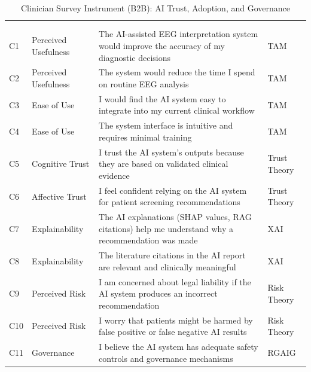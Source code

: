 {\tablestripes\tablefontsize
\begin{xltabular}{\textwidth}{@{} >{\raggedright\arraybackslash}p{0.5cm} >{\raggedright\arraybackslash}p{2.5cm} L p{1.5cm} @{}}
\caption{Clinician Survey Instrument (B2B): AI Trust, Adoption, and Governance}\label{app_tab:clinician_survey} \\
\toprule
\thead{\#} &  &  &  \\
\midrule
\endfirsthead
{} \\
\toprule
\thead{\#} &  &  &  \\
\midrule
\endhead
\bottomrule
\endlastfoot
C1 & Perceived Usefulness & The AI-assisted EEG interpretation system would improve the accuracy of my diagnostic decisions & TAM \\
\addlinespace
C2 & Perceived Usefulness & The system would reduce the time I spend on routine EEG analysis & TAM \\
\addlinespace
C3 & Ease of Use & I would find the AI system easy to integrate into my current clinical workflow & TAM \\
\addlinespace
C4 & Ease of Use & The system interface is intuitive and requires minimal training & TAM \\
\addlinespace
C5 & Cognitive Trust & I trust the AI system's outputs because they are based on validated clinical evidence & Trust Theory \\
\addlinespace
C6 & Affective Trust & I feel confident relying on the AI system for patient screening recommendations & Trust Theory \\
\addlinespace
C7 & Explainability & The AI explanations (SHAP values, RAG citations) help me understand why a recommendation was made & XAI \\
\addlinespace
C8 & Explainability & The literature citations in the AI report are relevant and clinically meaningful & XAI \\
\addlinespace
C9 & Perceived Risk & I am concerned about legal liability if the AI system produces an incorrect recommendation & Risk Theory \\
\addlinespace
C10 & Perceived Risk & I worry that patients might be harmed by false positive or false negative AI results & Risk Theory \\
\addlinespace
C11 & Governance & I believe the AI system has adequate safety controls and governance mechanisms & RGAIG \\

\end{xltabular}}
